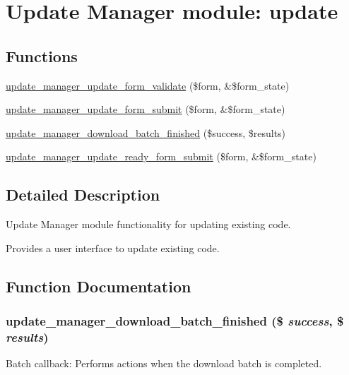 \hypertarget{group__update__manager__update}{
\section{Update Manager module: update}
\label{group__update__manager__update}
}
\subsection*{Functions}
\begin{DoxyCompactItemize}
\item 
\hyperlink{group__update__manager__update_ga578871dbee92e6bcb2f48ba232554c27}{update\_\-manager\_\-update\_\-form\_\-validate} (\$form, \&\$form\_\-state)
\item 
\hyperlink{group__update__manager__update_gaec3a60b324711da2e658cf10d9b85447}{update\_\-manager\_\-update\_\-form\_\-submit} (\$form, \&\$form\_\-state)
\item 
\hyperlink{group__update__manager__update_ga50343ba82d02305076486ec30c543f1f}{update\_\-manager\_\-download\_\-batch\_\-finished} (\$success, \$results)
\item 
\hyperlink{group__update__manager__update_gaeab4690bf95cb0d0b517a0b9161e5045}{update\_\-manager\_\-update\_\-ready\_\-form\_\-submit} (\$form, \&\$form\_\-state)
\end{DoxyCompactItemize}


\subsection{Detailed Description}
Update Manager module functionality for updating existing code.

Provides a user interface to update existing code. 

\subsection{Function Documentation}
\hypertarget{group__update__manager__update_ga50343ba82d02305076486ec30c543f1f}{
\subsubsection[{update\_\-manager\_\-download\_\-batch\_\-finished}]{\setlength{\rightskip}{0pt plus 5cm}update\_\-manager\_\-download\_\-batch\_\-finished (\$ {\em success}, \/  \$ {\em results})}}
\label{group__update__manager__update_ga50343ba82d02305076486ec30c543f1f}
Batch callback: Performs actions when the download batch is completed.


